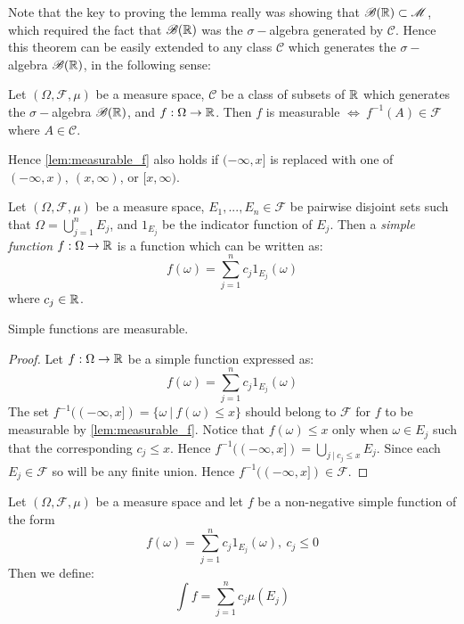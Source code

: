 \begin{remark}
  Note that the key to proving the lemma really was showing that $ \mathscr{B} (\mathbb{R}) \subset \mathscr{M}$, which required the fact that $ \mathscr{B}(\mathbb{R})$ was the $\sigma-$algebra generated by $ \mathscr{C}$. Hence this theorem can be easily extended to any class $ \mathscr{C}$ which generates the $\sigma-$algebra $ \mathscr{B}(\mathbb{R})$, in the following sense:
  \begin{lemma}
  Let $(\Omega, \mathscr{F}, \mu)$ be a measure space, $ \mathscr{C}$ be a class of subsets of $\mathbb{R}$ which generates the $\sigma-$algebra $ \mathscr{B} (\mathbb{R})$, and $f:\Omega \to \mathbb{R}$. Then $f$ is measurable $\iff\ f^{-1}(A) \in \mathscr{F}$ where $A\in \mathscr{C}$.
  \end{lemma}
  Hence \cref{lem:measurable_f} also holds if $(-\infty, x]$ is replaced with one of $(-\infty, x),\ (x, \infty)$, or $[x,\infty)$. 
\end{remark}
\begin{definition}
  Let $(\Omega, \mathscr{F}, \mu)$ be a measure space, $E_1,...,E_n\in \mathscr{F}$ be pairwise disjoint sets such that $\Omega = \bigcup_{j=1}^n E_j$, and $1_{E_j}$ be the indicator function of $E_j$. Then a \textit{simple function} $f:\Omega \to \mathbb{R}$ is a function which can be written as:
  \[f(\omega) = \sum_{j=1}^n c_j 1_{E_j}(\omega)\]
  where $c_j\in \mathbb{R}$.
\end{definition}
\begin{proposition}
  Simple functions are measurable. 
\end{proposition}
\begin{proof}
  Let $f:\Omega\to \mathbb{R}$ be a simple function expressed as:
  \[f(\omega) = \sum_{j=1}^n c_j 1_{E_j}(\omega)\]
  The set $f^{-1}((-\infty,x]) = \{\omega\ |\ f(\omega) \leq x\}$ should belong to $ \mathscr{F}$ for $f$ to be measurable by \cref{lem:measurable_f}. Notice that $f(\omega)\leq x$ only when $\omega\in E_j$ such that the corresponding $c_j \leq x$. Hence $f^{-1}((-\infty, x]) = \bigcup_{j\ |\ c_j\leq x} E_j$. Since each $E_j\in \mathscr{F}$ so will be any finite union. Hence $f^{-1}((-\infty, x])\in \mathscr{F}$.
\end{proof}
\begin{definition}
  Let $(\Omega, \mathscr{F}, \mu)$ be a measure space and let $f$ be a non-negative simple function of the form 
  \[f(\omega) = \sum_{j=1}^n c_j 1_{E_j}(\omega),\ c_j\leq 0\]
  Then we define:
  \[\int f = \sum_{j=1}^n c_j \mu(E_j)\]
\end{definition}
